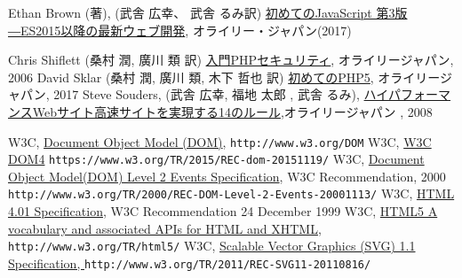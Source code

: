 \begin{thebibliography}{99}
Ethan Brown (著), (武舎 広幸、 武舎 るみ訳) 
\href{https://www.amazon.co.jp/%E5%88%9D%E3%82%81%E3%81%A6%E3%81%AEJavaScript-%E7%AC%AC3%E7%89%88-%E2%80%95ES2015%E4%BB%A5%E9%99%8D%E3%81%AE%E6%9C%80%E6%96%B0%E3%82%A6%E3%82%A7%E3%83%96%E9%96%8B%E7%99%BA-Ethan-Brown/dp/4873117836}
{初めてのJavaScript 第3版 ―ES2015以降の最新ウェブ開発}, オライリー・ジャパン(2017)
\iffalse
 \bibitem{Robinson}J. O. Robinson, {\it The Psychology of Visual
	 Illusion}, Dover, N. Y., 1998(originally published in 1972)
\fi
\ifSeminor
\else
 Chris Shiflett (桑村 潤, 廣川 類 訳)
\href{http://www.amazon.co.jp/入門PHPセキュリティ-クリス-シフレット/dp/4873112869/ref=sr_1_2?ie=UTF8&s=books&qid=1208069132&sr=1-2}
     {入門PHPセキュリティ}, オライリージャパン, 2006
\fi
\ifSeminor
\else
 David Sklar (桑村 潤, 廣川 類, 木下 哲也 訳)
\href{https://www.amazon.co.jp/%E5%88%9D%E3%82%81%E3%81%A6%E3%81%AEPHP-David-Sklar/dp/4873117933/ref=pd_sim_14_3?_encoding=UTF8&psc=1&refRID=E7D810BFS7XPWNDEQ4K5}
	 {初めてのPHP5}, オライリージャパン, 2017
\fi
\ifSeminor
\else
 Steve Souders,  (武舎 広幸, 福地 太郎 , 武舎 るみ),
\href{http://www.amazon.co.jp/%E3%83%8F%E3%82%A4%E3%83%91%E3%83%95%E3%82%A9%E3%83%BC%E3%83%9E%E3%83%B3%E3%82%B9Web%E3%82%B5%E3%82%A4%E3%83%88-%E2%80%95%E9%AB%98%E9%80%9F%E3%82%B5%E3%82%A4%E3%83%88%E3%82%92%E5%AE%9F%E7%8F%BE%E3%81%99%E3%82%8B14%E3%81%AE%E3%83%AB%E3%83%BC%E3%83%AB-Steve-Souders/dp/487311361X/ref=sr_1_1?ie=UTF8&qid=1304731142&sr=8-1}
{ハイパフォーマンスWebサイト\newline 高速サイトを実現する14のルール},オライリージャパン , 2008
\fi
\iffalse
 \bibitem{Stark}Jonathan Stark(増井 俊之, 牧野 聡 訳),\\
\href{http://www.amazon.co.jp/gp/product/4873114616/ref=cm_cr_asin_lnk}
{iPhoneアプリケーション開発ガイド　 HTML+CSS+JavaScript による開発手法},
オライリージャパン, 2010
\fi
 W3C, \href{http://www.w3.org/DOM}{Document Object Model (DOM)},
	 {\texttt{http://www.w3.org/DOM}}
 W3C,
				 \href{https://www.w3.org/TR/2015/REC-dom-20151119/}{W3C DOM4}
				 {\texttt{https://www.w3.org/TR/2015/REC-dom-20151119/}}
 W3C, 
\href{http://www.w3.org/TR/2000/REC-DOM-Level-2-Events-20001113/}
{Document Object Model(DOM) Level 2 Events Specification},
    W3C Recommendation, 2000
\texttt{http://www.w3.org/TR/2000/REC-DOM-Level-2-Events-20001113/}
 W3C, 
\href{http://www.w3.org/TR/html401/}
{HTML 4.01 Specification}, W3C Recommendation 24 December 1999
 W3C, \href{http://www.w3.org/TR/html5/}{HTML5
A vocabulary and associated APIs for HTML and XHTML}, \newline\texttt{http://www.w3.org/TR/html5/}
 W3C, \href{http://www.w3.org/TR/2011/REC-SVG11-20110816/}
      {Scalable Vector Graphics (SVG) 1.1 Specification, \protect\newline}
             {\texttt{http://www.w3.org/TR/2011/REC-SVG11-20110816/}}


\end{thebibliography}
